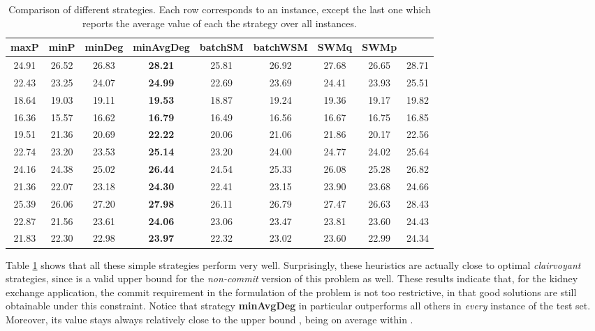 \documentclass[12pt]{article}
\begin{document}
\begin{table}
	\begin{center}
	\begin{tabular}{|c|c|c|c|c|c|c|c|c|}
		\hline
		maxP & minP & minDeg & minAvgDeg & batchSM & batchWSM & SWMq & SWMp &  \\
		\hline
			
		24.91 & 26.52 & 26.83 & {\bf 28.21} & 25.81 & 26.92 & 27.68 & 26.65 & 28.71 \\
		22.43 & 23.25 & 24.07 & {\bf 24.99} & 22.69 & 23.69 & 24.41 & 23.93 & 25.51 \\
	  18.64 & 19.03 & 19.11 & {\bf 19.53} & 18.87 & 19.24 & 19.36 & 19.17 & 19.82 \\
		16.36 & 15.57 & 16.62 & {\bf 16.79} & 16.49 & 16.56 & 16.67 & 16.75 & 16.85 \\
		19.51 & 21.36 & 20.69 & {\bf 22.22} & 20.06 & 21.06 & 21.86 & 20.17 & 22.56 \\
		22.74 & 23.20 & 23.53 & {\bf 25.14} & 23.20 & 24.00 & 24.77 & 24.02 & 25.64 \\
		24.16 & 24.38 & 25.02 & {\bf 26.44} & 24.54 & 25.33 & 26.08 & 25.28 & 26.82 \\
		21.36 & 22.07 & 23.18 & {\bf 24.30} & 22.41 & 23.15 & 23.90 & 23.68 & 24.66 \\
		25.39 & 26.06 & 27.20 & {\bf 27.98} & 26.11 & 26.79 & 27.47 & 26.63 & 28.43 \\
		22.87 & 21.56 & 23.61 & {\bf 24.06} & 23.06 & 23.47 & 23.81 & 23.60 & 24.43 \\
		\hline
		21.83 & 22.30 & 22.98 & {\bf 23.97} & 22.32 & 23.02 & 23.60 & 22.99 & 24.34 \\
		\hline
	\end{tabular}
	\end{center}
	\caption{Comparison of different strategies. Each row corresponds to an instance, except the last one which reports the average value of each the strategy over all instances.}
	\label{tab:heu}
\end{table}
		
	Table \ref{tab:heu} shows that all these simple strategies perform very well. Surprisingly, these heuristics are actually close to optimal \emph{clairvoyant} strategies, since  is a valid upper bound for the \emph{non-commit} version of this problem as well. These results indicate that, for the kidney exchange application, the commit requirement in the formulation of the problem is not too restrictive, in that good solutions are still obtainable under this constraint. Notice that strategy {\bf minAvgDeg} in particular outperforms all others in \emph{every} instance of the test set. Moreover, its value stays always relatively close to the upper bound , being on average within .
		
\end{document}

